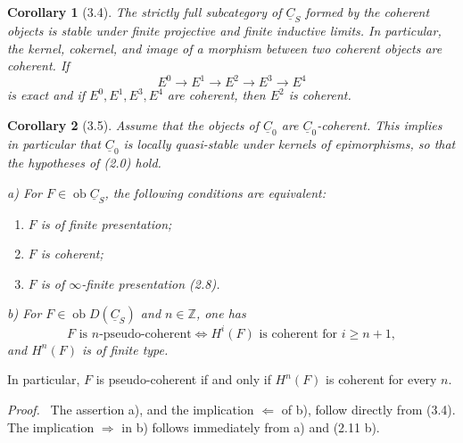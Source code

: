 \documentclass[13pt]{extarticle}
\newcommand{\ZZ}{\mathbb Z}
\newcommand{\uC}{\underline C}
\newcommand{\ob}{\operatorname{ob}}
\newenvironment{prooftext}[1][Proof]{\par\noindent\emph{#1.}\ }{\par\medskip}
\newtheorem*{corollary*}{Corollary}
\begin{document}
\begin{corollary*}[3.4]
The strictly full subcategory of $\uC_S$ formed by the coherent objects is stable under finite projective and finite inductive limits. In particular, the kernel, cokernel, and image of a morphism between two coherent objects are coherent. If
\[
E^0\longrightarrow E^1\longrightarrow E^2\longrightarrow E^3\longrightarrow E^4
\]
is exact and if $E^0,E^1,E^3,E^4$ are coherent, then $E^2$ is coherent.
\end{corollary*}

\begin{corollary*}[3.5]
Assume that the objects of $\uC_0$ are $\uC_0$-coherent. This implies in particular that $\uC_0$ is locally quasi-stable under kernels of epimorphisms, so that the hypotheses of (2.0) hold.

\textup{a)} For $F\in\ob\uC_S$, the following conditions are equivalent:
\begin{enumerate}[label=(\roman*)]
\item $F$ is of finite presentation;
\item $F$ is coherent;
\item $F$ is of $\infty$-finite presentation (2.8).
\end{enumerate}

\textup{b)} For $F\in\ob D(\uC_S)$ and $n\in\ZZ$, one has
\[
F\text{ is }n\text{-pseudo-coherent}
\Longleftrightarrow
H^i(F)\text{ is coherent for }i\geq n+1,
\]
and $H^n(F)$ is of finite type.
\end{corollary*}

In particular, $F$ is pseudo-coherent if and only if $H^n(F)$ is coherent for every $n$.

\begin{prooftext}
The assertion a), and the implication $\Leftarrow$ of b), follow directly from (3.4). The implication $\Rightarrow$ in b) follows immediately from a) and (2.11 b).
\end{prooftext}
\end{document}
